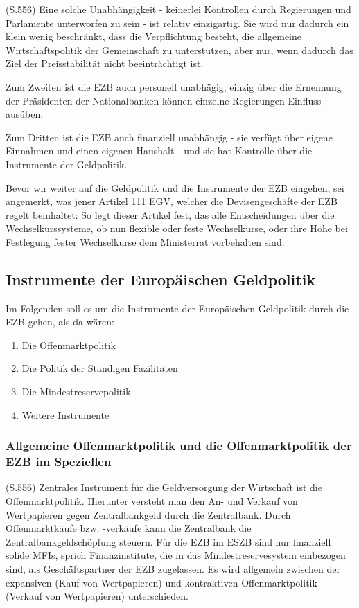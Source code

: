 \documentclass[
    onecolumn,
    a4paper,
    abstracton,
    parskip=half
    ,final
    ]{scrartcl}
\begin{document}
(S.556)
Eine solche Unabh{\"a}ngigkeit - keinerlei Kontrollen durch Regierungen und Parlamente unterworfen zu sein -  ist relativ einzigartig. Sie wird nur dadurch ein klein wenig beschr{\"a}nkt, dass die Verpflichtung besteht, die allgemeine Wirtschaftspolitik der Gemeinschaft zu unterst{\"u}tzen, aber nur, wenn dadurch das Ziel der Preisstabilit{\"a}t nicht beeintr{\"a}chtigt ist.

Zum Zweiten ist die EZB auch personell unabh{\"a}gig, einzig {\"u}ber die Ernennung der Pr{\"a}sidenten der Nationalbanken k{\"o}nnen einzelne Regierungen Einfluss aus{\"u}ben.

Zum Dritten ist die EZB auch finanziell unabh{\"a}ngig - sie verf{\"u}gt {\"u}ber eigene Einnahmen und einen eigenen Haushalt - und sie hat Kontrolle {\"u}ber die Instrumente der Geldpolitik.


Bevor wir weiter auf die Geldpolitik und die Instrumente der EZB eingehen, sei angemerkt, was jener Artikel 111 EGV, welcher die Devisengesch{\"a}fte der EZB regelt beinhaltet:
So legt dieser Artikel fest, das alle Entscheidungen {\"u}ber die Wechselkurssysteme, ob nun flexible oder feste Wechselkurse, oder ihre H{\"o}he bei Festlegung fester Wechselkurse dem Ministerrat vorbehalten sind. \citep[vgl.][S.555]{Basseler2010}




\subsection{Instrumente der Europ{\"a}ischen Geldpolitik}

Im Folgenden soll es um die Instrumente der Europ{\"a}ischen Geldpolitik durch die EZB gehen, als da w{\"a}ren:
\begin{enumerate}
  \item{Die Offenmarktpolitik}
  \item{Die Politik der St{\"a}ndigen Fazilit{\"a}ten}
  \item{Die Mindestreservepolitik.}
  \item{Weitere Instrumente}
\end{enumerate}




\subsubsection{Allgemeine Offenmarktpolitik und die Offenmarktpolitik der EZB im Speziellen}

(S.556)
Zentrales Instrument f{\"u}r die Geldversorgung der Wirtschaft ist die Offenmarktpolitik. Hierunter versteht man den An- und Verkauf von Wertpapieren gegen Zentralbankgeld durch die Zentralbank.
Durch Offenmarktk{\"a}ufe bzw. -verk{\"a}ufe kann die Zentralbank die Zentralbankgeldsch{\"o}pfung steuern. F{\"u}r die EZB im ESZB sind nur finanziell solide MFIs, sprich Finanzinstitute, die in das Mindestreservesystem einbezogen sind, als Gesch{\"a}ftspartner der EZB zugelassen.
Es wird allgemein zwischen der expansiven (Kauf von Wertpapieren) und kontraktiven Offenmarktpolitik (Verkauf von Wertpapieren) unterschieden.
\end{document}
